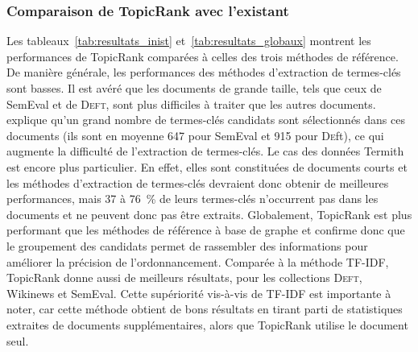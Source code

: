       \subsubsection{Comparaison de TopicRank avec l'existant}
      \label{subsubsec:main:domain_independent_keyphrase_extraction-unsupervised_automatic_keyphrase_extraction-evaluation-comparison}
        Les tableaux~\ref{tab:resultats_inist} et~\ref{tab:resultats_globaux}
        montrent les performances de TopicRank comparées à celles des trois
        méthodes de référence. De manière générale, les performances des
        méthodes d'extraction de termes-clés sont basses. Il est avéré que les
        documents de grande taille, tels que ceux de SemEval et de
        \textsc{Deft}, sont plus difficiles à traiter que les autres documents.
         explique qu'un grand nombre de
        termes-clés candidats sont sélectionnés dans ces documents (ils sont en
        moyenne 647 pour SemEval et 915 pour \textsc{De}ft), ce qui augmente la
        difficulté de l'extraction de termes-clés. Le cas des données Termith
        est encore plus particulier. En effet, elles sont constituées de
        documents courts et les méthodes d'extraction de termes-clés devraient
        donc obtenir de meilleures performances, mais 37 à 76~\% de leurs
        termes-clés n'occurrent pas dans les documents et ne peuvent donc pas
        être extraits.
        Globalement, TopicRank est plus performant que les méthodes de référence
        à base de graphe et confirme donc que le groupement des candidats
        permet de rassembler des informations pour améliorer la précision de
        l'ordonnancement.
        Comparée à la méthode TF-IDF, TopicRank donne aussi de meilleurs
        résultats, pour les collections \textsc{Deft}, Wikinews et SemEval.
        Cette supériorité vis-à-vis de TF-IDF est importante à noter, car cette
        méthode obtient de bons résultats en tirant parti de statistiques
        extraites de documents supplémentaires, alors que TopicRank utilise le
        document seul.
